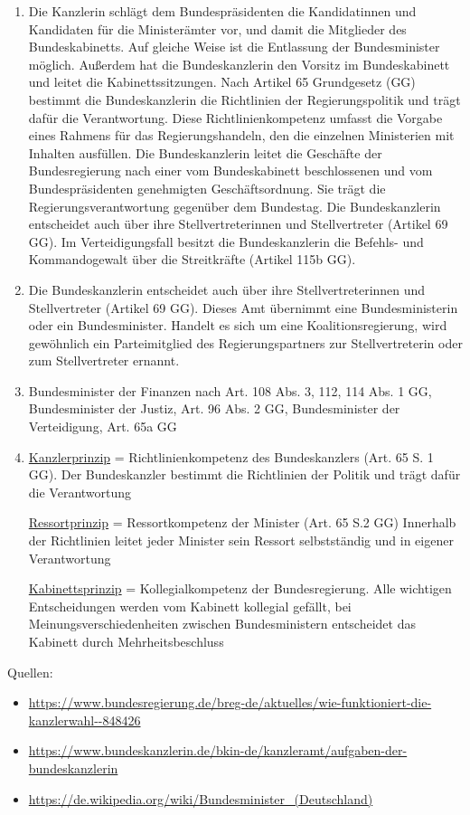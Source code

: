\documentclass{article}
\begin{document}
\begin{enumerate}[label=(\alph*)]
		\item Die Kanzlerin schlägt dem Bundespräsidenten die Kandidatinnen und Kandidaten für die Ministerämter vor, und damit die Mitglieder des Bundeskabinetts. Auf gleiche Weise ist die Entlassung der Bundesminister möglich. Außerdem hat die Bundeskanzlerin den Vorsitz im Bundeskabinett und leitet die Kabinettssitzungen. Nach Artikel 65 Grundgesetz (GG) bestimmt die Bundeskanzlerin die Richtlinien der Regierungspolitik und trägt dafür die Verantwortung. Diese Richtlinienkompetenz umfasst die Vorgabe eines Rahmens für das Regierungshandeln, den die einzelnen Ministerien mit Inhalten ausfüllen. Die Bundeskanzlerin leitet die Geschäfte der Bundesregierung nach einer vom Bundeskabinett beschlossenen und vom Bundespräsidenten genehmigten Geschäftsordnung. Sie trägt die Regierungsverantwortung gegenüber dem Bundestag. Die Bundeskanzlerin entscheidet auch über ihre Stellvertreterinnen und Stellvertreter (Artikel 69 GG). Im Verteidigungsfall besitzt die Bundeskanzlerin die Befehls- und Kommandogewalt über die Streitkräfte (Artikel 115b GG).
		\item Die Bundeskanzlerin entscheidet auch über ihre Stellvertreterinnen und Stellvertreter (Artikel 69 GG). Dieses Amt übernimmt eine Bundesministerin oder ein Bundesminister. Handelt es sich um eine Koalitionsregierung, wird gewöhnlich ein Parteimitglied des Regierungspartners zur Stellvertreterin oder zum Stellvertreter ernannt.
		\item Bundesminister der Finanzen nach Art. 108 Abs. 3, 112, 114 Abs. 1 GG, Bundesminister der Justiz, Art. 96 Abs. 2 GG, Bundesminister der Verteidigung, Art. 65a GG
		\item \underline{Kanzlerprinzip} = Richtlinienkompetenz des Bundeskanzlers (Art. 65 S. 1 GG). Der Bundeskanzler bestimmt die Richtlinien der Politik und trägt dafür die Verantwortung
		
		\underline{Ressortprinzip} = Ressortkompetenz der Minister (Art. 65 S.2 GG) Innerhalb der Richtlinien leitet jeder Minister sein Ressort selbstständig und in eigener Verantwortung
		
		\underline{Kabinettsprinzip} = Kollegialkompetenz der Bundesregierung. Alle wichtigen Entscheidungen werden vom Kabinett kollegial gefällt, bei Meinungsverschiedenheiten zwischen Bundesministern entscheidet das Kabinett durch Mehrheitsbeschluss
	\end{enumerate}

	Quellen:
	\begin{itemize}
		\item \url{https://www.bundesregierung.de/breg-de/aktuelles/wie-funktioniert-die-kanzlerwahl--848426}
		\item \url{https://www.bundeskanzlerin.de/bkin-de/kanzleramt/aufgaben-der-bundeskanzlerin}
		\item \url{https://de.wikipedia.org/wiki/Bundesminister_(Deutschland)}
	\end{itemize}
\end{document}
